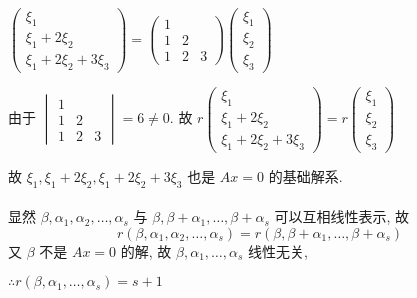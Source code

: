 	 \paragraph{} %
		 \( \begin{pmatrix}
			 \xi_{1}          \\
			 \xi_{1}+2\xi_{2} \\
			 \xi_{1}+2\xi_{2}+3\xi_{3}
		 \end{pmatrix} = \begin{pmatrix}
			 1         \\
			 1 & 2     \\
			 1 & 2 & 3
		 \end{pmatrix}\begin{pmatrix}
			 \xi_{1} \\
			 \xi_{2} \\
			 \xi_{3}
		 \end{pmatrix} \)

		 由于 \( \begin{vmatrix}
			 1         \\
			 1 & 2     \\
			 1 & 2 & 3
		 \end{vmatrix} = 6 \neq 0 \). 故 \( r\begin{pmatrix}
			 \xi_{1}          \\
			 \xi_{1}+2\xi_{2} \\
			 \xi_{1}+2\xi_{2}+3\xi_{3}
		 \end{pmatrix} = r\begin{pmatrix}
			 \xi_{1} \\
			 \xi_{2} \\
			 \xi_{3}
		 \end{pmatrix} \)

		 故 \( \xi_{1}, \xi_{1}+2\xi_{2}, \xi_{1}+2\xi_{2}+3\xi_{3} \) 也是 \( Ax=0 \) 的基础解系.


	 \paragraph{} %
		 显然 \( \beta, \alpha_{1}, \alpha_{2}, \dots, \alpha_{s} \) 与 \( \beta, \beta+\alpha_{1}, \dots, \beta+\alpha_{s} \) 可以互相线性表示, 故
		 \[ r(\beta, \alpha_{1}, \alpha_{2}, \dots, \alpha_{s}) = r(\beta, \beta+\alpha_{1}, \dots, \beta+\alpha_{s}) \]
		 又 \( \beta \) 不是 \( Ax=0 \) 的解, 故 \( \beta, \alpha_{1}, \dots, \alpha_{s} \) 线性无关,

		 \( \therefore r(\beta, \alpha_{1}, \dots, \alpha_{s}) = s+1 \)

